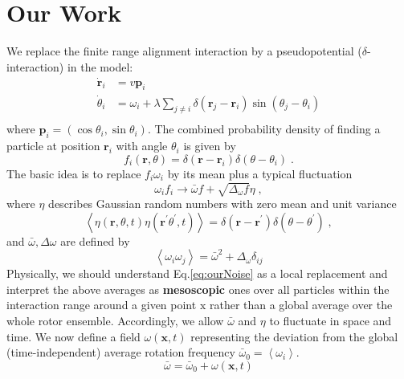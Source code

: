\documentclass{article}
\begin{document}
\section{Our Work}
We replace the finite range alignment interaction by a pseudopotential ($\delta$-interaction) in the model:
\begin{equation}
    \label{eq:ourModel}
    \begin{aligned}
        \dot{\mathbf{r}}_i&=v\mathbf{p}_i\\
        \dot{\theta}_i&=\omega _i+\lambda \sum_{j\ne i}{\delta}\left( \mathbf{r}_j-\mathbf{r}_i \right) \sin \left( \theta _j-\theta _i \right)\\
    \end{aligned}
\end{equation}
where $\mathbf{p}_i=(\cos\theta_i, \sin\theta_i)$. The combined probability density of finding a particle at position $\mathbf{r}_i$ with angle $\theta_i$ is given by
\begin{equation}
    f_i\left( \mathbf{r},\theta \right) =\delta \left( \mathbf{r}-\mathbf{r}_i \right) \delta \left( \theta -\theta _i \right)\;.
\end{equation}
The basic idea is to replace $f_i\omega_i$ by its mean plus a typical fluctuation
\begin{equation}
    \label{eq:ourNoise}
    \omega _if_i\longrightarrow \bar{\omega}f+\sqrt{\Delta _{\omega}f}\eta\;,
\end{equation}
where $\eta$ describes Gaussian random numbers with zero mean and unit variance 
\begin{equation}
    \left\langle\eta(\mathbf{r}, \theta, t) \eta\left(\mathbf{r}^{\prime} \theta^{\prime}, t\right)\right\rangle=\delta\left(\mathbf{r}-\mathbf{r}^{\prime}\right) \delta\left(\theta-\theta^{\prime}\right)\;,
\end{equation}
and $\bar{\omega}, \Delta\omega$ are defined by
\begin{equation}
    \left \langle \omega _i\omega _j \right \rangle =\bar{\omega}^2+\Delta _{\omega}\delta _{ij}
\end{equation}
Physically, we should understand Eq.\eqref{eq:ourNoise} as a local replacement and interpret the above averages as \textbf{mesoscopic} ones
over all particles within the interaction range around a given point $\textrm{x}$ rather than a global average over the whole rotor
ensemble. Accordingly, we allow $\bar{\omega}$ and $\eta$ to fluctuate in space and time. We now define a field $\omega(\mathbf{x}, t)$ representing the deviation from the global (time-independent) average rotation frequency $\bar{\omega}_0=\left< \omega _i \right>$.
\begin{equation}
    \bar{\omega}=\bar{\omega}_0+\omega \left( \mathbf{x},t \right)
\end{equation}
\end{document}
